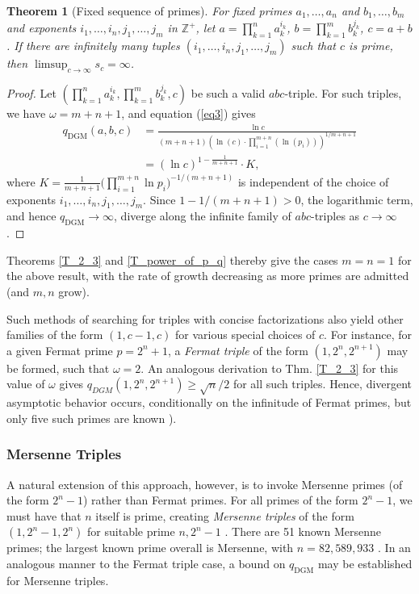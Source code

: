 \documentclass[11pt,letterpaper]{amsart}
\newtheorem{theorem}{Theorem}[section]
\def\Z{\mathbb{Z}}
\def\ra{\rightarrow}
\def\Z{\mathbb{Z}}
\begin{document}
\begin{theorem}[Fixed sequence of primes]\label{T_main}
For fixed primes $a_1,\dots,a_n$ and $b_1,\dots,b_m$ and exponents $i_1,\dots,i_n,j_1,\dots,j_m$ in $\Z^{+}$, let $a=\prod_{k=1}^n a_k^{i_k}$, $b=\prod_{k=1}^m b_k^{j_k}$, $c=a+b$. If there are infinitely many tuples $(i_1,\dots,i_n,j_1,\dots,j_m)$ such that $c$ is prime, then $\limsup_{c\to\infty}s_c=\infty$.
\end{theorem}
\begin{proof}
Let $\left( \prod_{k = 1}^n a_k^{i_k}, \prod_{k = 1}^{m} b_k^{j_k}, c\right)$ be such a valid $abc$-triple. For such triples, we have $\omega=m+n+1$, and equation (\ref{eq3}) gives
\begin{align*}
q_{\mathrm{DGM}}(a,b,c) &= \frac{\ln c}{(m\!+\!n\!+\!1)\left( \ln(c) \cdot {\prod_{i=1}^{m+n} (\ln (p_i))}\right)^{1/{m + n + 1}}}\\
 &= (\ln c)^{1-\frac{1}{m+n+1}}\cdot K,
\end{align*}
where $K=\frac{1}{m + n + 1}\bigl(\prod_{i=1}^{m+n}\ln p_i\bigr)^{-1/(m+n+1)}$ is independent of the choice of exponents $i_1, \dotsc, i_n, j_1, \dotsc, j_m$. Since $1-1/(m+n+1)>0$, the logarithmic term, and hence $q_{\mathrm{DGM}}\to\infty$, diverge along the infinite family of $abc$-triples as $c \ra \infty$.
\end{proof}
Theorems \ref{T_2_3} and \ref{T_power_of_p_q} thereby give the cases $m = n = 1$ for the above result, with the rate of growth decreasing as more primes are admitted (and $m,n$ grow).

Such methods of searching for triples with concise factorizations also yield other families of the form $(1, c - 1, c)$ for various special choices of $c$. For instance, for a given Fermat prime $p = 2^{n} + 1$, a \textit{Fermat triple} of the form $(1, 2^n,2 ^{n + 1})$ may be formed, such that $\omega = 2$. An analogous derivation to Thm. \ref{T_2_3} for this value of $\omega$ gives $q_{DGM}(1, 2^n, 2^{n + 1}) \ge \sqrt{n}/2$ for all such triples. Hence, divergent asymptotic behavior occurs, conditionally on the infinitude of Fermat primes, but only five such primes are known \cite{tsang2010}).
\subsubsection{Mersenne Triples}
A natural extension of this approach, however, is to invoke Mersenne primes (of the form $2^n - 1$) rather than Fermat primes. For all primes of the form $2^n - 1$, we must have that $n$ itself is prime, creating \textit{Mersenne triples }of the form $(1, 2^{n} - 1, 2^{n})$ for suitable prime $n, 2^n - 1$ \cite{mersenne}. There are 51 known Mersenne primes; the largest known prime overall is Mersenne, with $n=82{,}589{,}933$ \cite{mersennelist}. In an analogous manner to the Fermat triple case, a bound on $q_{\text{DGM}}$ may be established for Mersenne triples.
\end{document}
